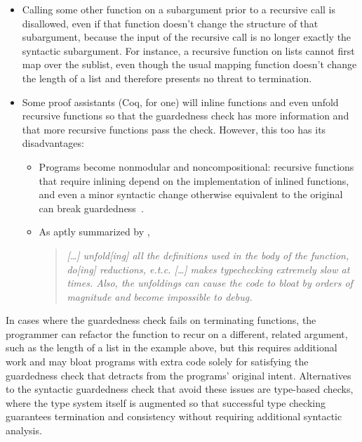 \begin{itemize}
  \item Calling some other function on a subargument prior to a recursive call is disallowed,
    even if that function doesn't change the structure of that subargument,
    because the input of the recursive call is no longer exactly the syntactic subargument.
    For instance, a recursive function on lists cannot first map over the sublist,
    even though the usual mapping function doesn't change the length of a list
    and therefore presents no threat to termination.
  \item Some proof assistants (Coq, for one) will inline functions and even unfold recursive functions
    so that the guardedness check has more information
    and that more recursive functions pass the check.
    However, this too has its disadvantages:
    \begin{itemize}
      \item Programs become nonmodular and noncompositional:
        recursive functions that require inlining
        depend on the implementation of inlined functions,
        and even a minor syntactic change otherwise equivalent to the original
        can break guardedness~\citep{CIC-hat-minus}.
      \item As aptly summarized by \citet{coqterm},
        \begin{quote}
        \begin{singlespace}
        \textit{{\rm [\ldots]} unfold{\rm [ing]} all the definitions used in the body of the function, do{\rm [ing]} reductions, e.t.c.
        {\rm [\ldots]} makes typechecking extremely slow at times.
        Also, the unfoldings can cause the code to bloat by orders of magnitude and become impossible to debug.}
        \end{singlespace}
        \end{quote}
    \end{itemize}
\end{itemize}

In cases where the guardedness check fails on terminating functions,
the programmer can refactor the function to recur on a different, related argument,
such as the length of a list in the example above,
but this requires additional work and may bloat programs
with extra code solely for satisfying the guardedness check
that detracts from the programs' original intent.
Alternatives to the syntactic guardedness check that avoid these issues are type-based checks,
where the type system itself is augmented so that successful type checking
guarantees termination and consistency without requiring additional syntactic analysis.

